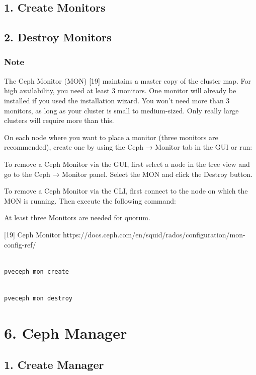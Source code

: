 \subsection{1. Create Monitors}

\subsection{2. Destroy Monitors}

\subsubsection{Note}

The Ceph Monitor (MON) [19] maintains a master copy of the cluster map. For high availability, you need at least 3 monitors. One monitor will already be installed if you used the installation wizard. You won’t need more than 3 monitors, as long as your cluster is small to medium-sized. Only really large clusters will require more than this.

On each node where you want to place a monitor (three monitors are recommended), create one by using the Ceph → Monitor tab in the GUI or run:

To remove a Ceph Monitor via the GUI, first select a node in the tree view and go to the Ceph → Monitor panel. Select the MON and click the Destroy button.

To remove a Ceph Monitor via the CLI, first connect to the node on which the MON is running. Then execute the following command:

At least three Monitors are needed for quorum.

[19] Ceph Monitor https://docs.ceph.com/en/squid/rados/configuration/mon-config-ref/

\begin{lstlisting}

pveceph mon create

\end{lstlisting}

\begin{lstlisting}

pveceph mon destroy

\end{lstlisting}


\section{6. Ceph Manager}

\subsection{1. Create Manager}

